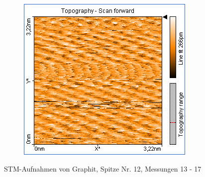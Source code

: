\begin{figure}
\begin{subfigure}[b]{\picwidth}
        \caption{}
        \label{fig:graphit_06_16}
    \end{subfigure}
    \begin{subfigure}[b]{\picwidth}
        \includegraphics[width=\textwidth]{data/Graphit/pic_06_17_3nm_set_point_2nA}
        \caption{}
        \label{fig:graphit_06_17}
    \end{subfigure}
    \caption{STM-Aufnahmen von Graphit, Spitze Nr. 12, Messungen 13 - 17}\label{fig:graphit_06}
\end{figure}
\flushleft


